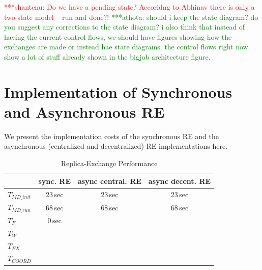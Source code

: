 \documentclass{rspublic}
\newcommand{\jhanote}[1]{ {\textcolor{red} { ***shantenu: #1 }}}
\newcommand{\alnote}[1]{ {\textcolor{blue} { ***andre: #1 }}}
\newcommand{\athotanote}[1]{ {\textcolor{green} { ***athota: #1 }}}
\newcommand{\alnote}[1]{}
\newcommand{\athotanote}[1]{}
\newcommand{\jhanote}[1]{}
\begin{document}
\jhanote{Do we have a pending state? Accoridng to Abhinav there is
  only a two-state model -- run and done?!} \athotanote{should i keep the state diagram? do you suggest any corrections to the state diagram? i also think that instead of having the current control flows, we should have figures showing how the exchanges are made or instead hae state diagrams. the control flows right now show a lot of stuff already shown in the bigjob architecture figure. }
  

\section{Implementation of Synchronous and Asynchronous RE}



We present the implementation costs of the synchronous RE and the
asynchronous (centralized and decentralized) RE implementations here.


\begin{table}
    \centering
	\begin{tabular}{|l|c|c|c|}
	\hline
	                        &sync. RE &async central. RE &async decent. RE\\
	\hline
	$T_{MD\_init}$  &23\,sec &23\,sec &23\,sec\\
	\hline
	$T_{MD\_run}$   &68\,sec &68\,sec &68\,sec\\
	\hline
	$T_{F}$           &0\,sec &&\\
	\hline
	$T_{W}$           &&&\\
	\hline
	$T_{EX}$          &&&\\
	\hline
	$T_{COORD}$       &&&\\
	\hline
	\end{tabular}
	\caption{Replica-Exchange Performance}
	\label{table:repex_perf}
\end{table}
\end{document}
